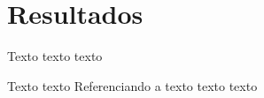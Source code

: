 \chapter{Resultados}
\label{chap:resultados}

Texto texto texto

Texto texto  Referenciando a  texto texto texto 